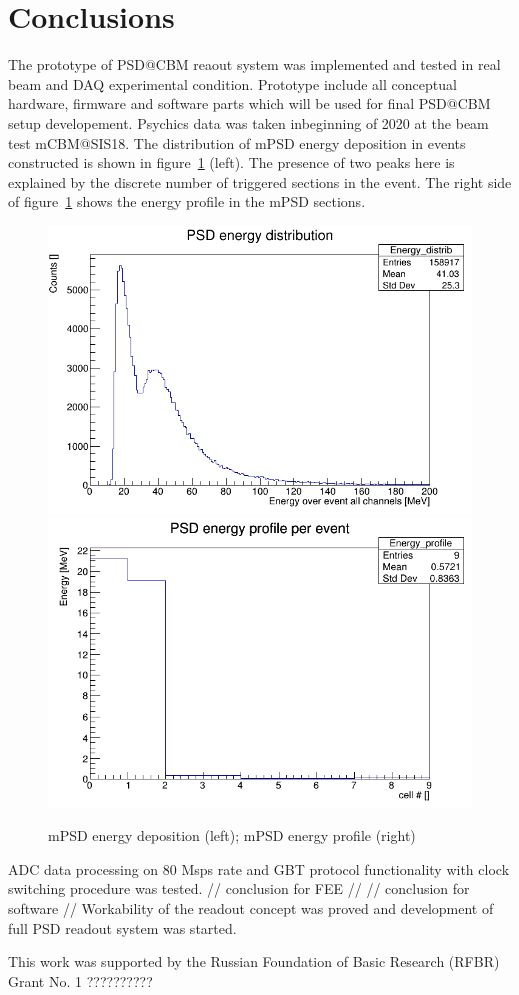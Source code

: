 \documentclass[a4paper,11pt]{article}
\begin{document}
\section{Conclusions}
The prototype of PSD@CBM reaout system was implemented and tested in real beam and DAQ experimental condition. Prototype include all conceptual hardware, firmware and software parts which will be used for final PSD@CBM setup developement. Psychics data was taken inbeginning of 2020 at the beam test mCBM@SIS18.
The distribution of mPSD energy deposition in events constructed is shown in figure~\ref{fig:7} (left). The presence of two peaks here is explained by the discrete number of triggered sections in the event. The right side of figure~\ref{fig:7} shows the energy profile in the mPSD sections.

\begin{figure}[htbp]
\centering %
\includegraphics[width=.45\textwidth]{PsdEdepInEvent_calibrd.png}
\qquad
\includegraphics[width=.45\textwidth]{PsdEprofileInEvent_calibrd.png}
\caption{\label{fig:7} mPSD energy deposition (left); mPSD energy profile (right)}
\end{figure}

ADC data processing on 80 Msps rate and GBT protocol functionality with clock switching procedure was tested. 
// conclusion for FEE //
// conclusion for software //
Workability of the readout concept was proved and development of full PSD readout system was started.

\acknowledgments
This work was supported by the Russian Foundation of Basic Research (RFBR) Grant No. 1 ??????????
\end{document}

